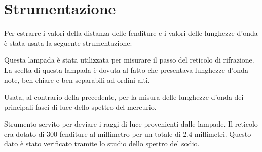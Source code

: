 \documentclass[a4paper,10pt]{article}
\begin{document}
	
	\section{Strumentazione}
	Per estrarre i valori della distanza delle fenditure e i valori delle lunghezze d'onda è stata usata la seguente strumentazione:
	\begin{description}[align=left]
		\item [Una lampada al sodio] Questa lampada è stata utilizzata per misurare il passo del reticolo di rifrazione. La scelta di questa lampada è dovuta al fatto che presentava lunghezze d'onda note, ben chiare e ben separabili ad ordini alti.
		
		\item [Una lampada al mercurio] Usata, al contrario della precedente, per la misura delle lunghezze d'onda dei principali fasci di luce dello spettro del mercurio. 
		
		\item [Un reticolo di diffrazione] Strumento servito per deviare i raggi di luce provenienti dalle lampade. Il reticolo era dotato di 300 fenditure al millimetro per un totale di 2.4 millimetri. Questo dato è stato verificato tramite lo studio dello spettro del sodio.
		

\end{description}
\end{document}
